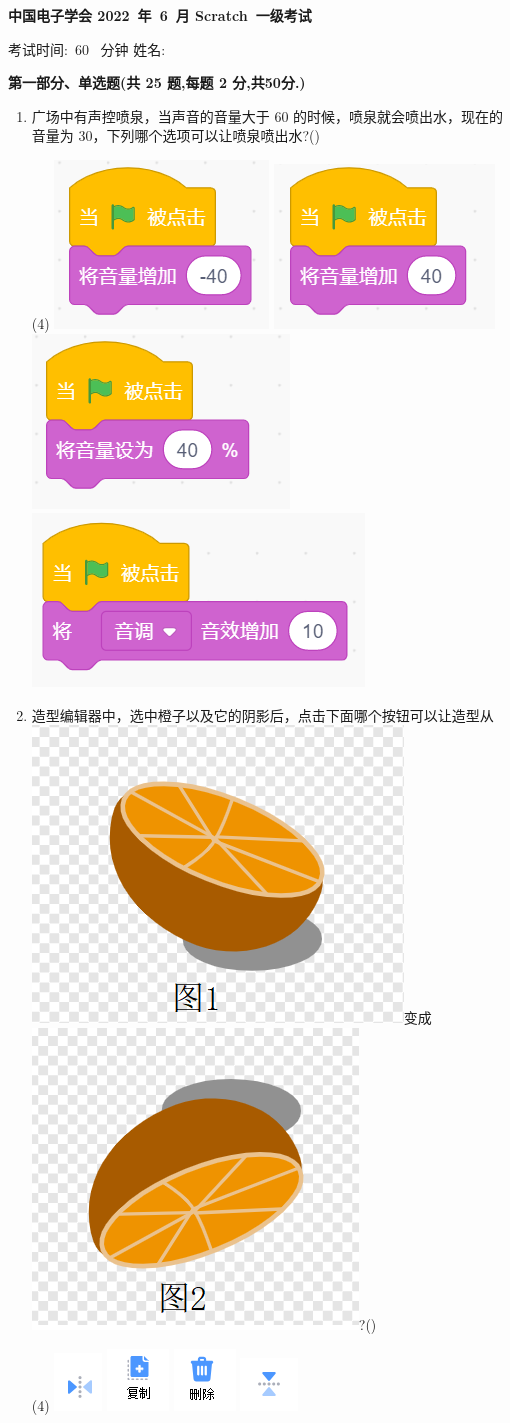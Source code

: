 \documentclass[10pt, a4paper]{article}
\newcommand{\Title}[3]{
    \begin{center}
        \Large \textbf{中国电子学会 #1~年~#2~月 Scratch~#3级考试}
    \end{center}
}
\newcommand{\TimeAndName}[1]{
    \begin{center}
        考试时间:~#1~ 分钟 \qquad\qquad\qquad\qquad 姓名:\underline{\quad\quad\quad\quad}
    \end{center}
}
\begin{document}
    \Title{2022}{6}{一} %
    \TimeAndName{60} %

    \vspace{2mm}
    {\noindent\textbf{第一部分、单选题(共 25 题,每题 2 分,共50分.)}}
    \begin{enumerate}
        \item 广场中有声控喷泉，当声音的音量大于 60 的时候，喷泉就会喷出水，现在的音量为 30，下列哪个选项可以让喷泉喷出水?(\qquad)
        \begin{tasks}(4)
            \task \includegraphics[width=.12\textwidth]{1a.png}
            \task \includegraphics[width=.12\textwidth]{1b.png}
            \task \includegraphics[width=.15\textwidth]{1c.png}
            \task \includegraphics[width=.18\textwidth]{1d.png}
        \end{tasks}

        \item 造型编辑器中，选中橙子以及它的阴影后，点击下面哪个按钮可以让造型从\includegraphics[width=.08\textwidth]{2-1.png}变成\includegraphics[width=.07\textwidth]{2-2.png}?(\qquad)
        \begin{tasks}(4)
            \task \includegraphics[width=.05\textwidth]{2a.png}
            \task \includegraphics[width=.05\textwidth]{2b.png}
            \task \includegraphics[width=.05\textwidth]{2c.png}
            \task \includegraphics[width=.05\textwidth]{2d.png}
        \end{tasks}


\end{enumerate}
\end{document}
